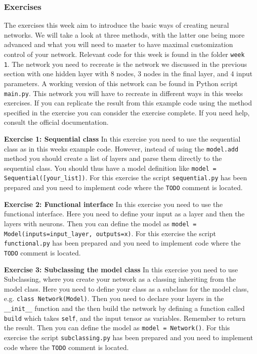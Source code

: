 \documentclass[12pt,a4paper]{article} %
\numberwithin{equation}{section}
\begin{document}
		\subsubsection{Exercises}
			The exercises this week aim to introduce the basic ways of creating neural networks. We will take a look at three methods, with the latter one being more advanced and what you will need to master to have maximal customization control of your network. Relevant code for this week is found in the folder \texttt{week 1}. The network you need to recreate is the network we discussed in the previous section with one hidden layer with 8 nodes, 3 nodes in the final layer, and 4 input parameters. A working version of this network can be found in Python script \texttt{main.py}. This network you will have to recreate in different ways in this weeks exercises. If you can replicate the result from this example code using the method specified in the exercise you can consider the exercise complete. If you need help, consult the official documentation. \newline
			
			\textbf{Exercise 1: Sequential class}\newline
			In this exercise you need to use the sequential class as in this weeks example code. However, instead of using the \texttt{model.add} method you should create a list of layers and parse them directly to the sequential class. You should thus have a model definition like \texttt{model = Sequential([your\_list])}. For this exercise the script \texttt{sequential.py} has been prepared and you need to implement code where the \texttt{TODO} comment is located.\newline
			
			\textbf{Exercise 2: Functional interface}\newline
			In this exercise you need to use the functional interface. Here you need to define your input as a layer and then the layers with neurons. Then you can define the model as \texttt{model = Model(inputs=input\_layer, outputs=x)}. For this exercise the script \texttt{functional.py} has been prepared and you need to implement code where the \texttt{TODO} comment is located.\newline
			
			\textbf{Exercise 3: Subclassing the model class}\newline
			In this exercise you need to use Subclassing, where you create your network as a classing inheriting from the model class. Here you need to define your class as a subclass for the model class, e.g. \texttt{class Network(Model)}. Then you need to declare your layers in the \texttt{\_\_init\_\_} function and the then build the network by defining a function called \texttt{build} which takes \texttt{self}, and the input tensor as variables. Remember to return the result. Then you can define the model as \texttt{model = Network()}. For this exercise the script \texttt{subclassing.py} has been prepared and you need to implement code where the \texttt{TODO} comment is located.\newline
		
\end{document}
